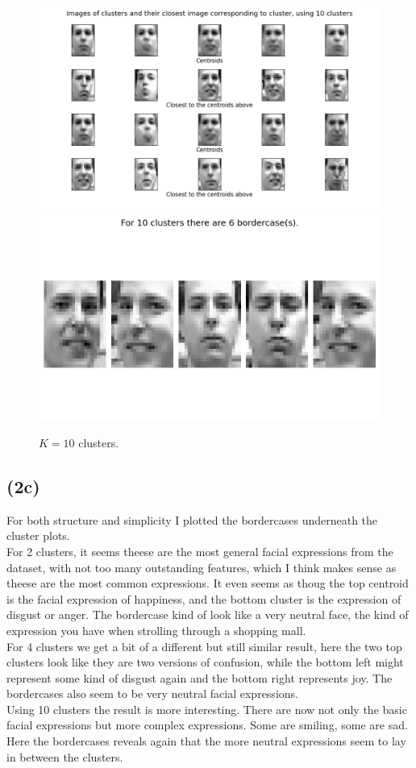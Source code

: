 \documentclass[12pt, letterpaper]{article}
\begin{document}
      \begin{figure}[H]
        \caption{$K = 10$ clusters.}
        \centering
        \includegraphics[scale=0.7]{cluster10}
        \includegraphics[scale=0.4]{border10}
      \end{figure}
    \subsection*{(2c)}
      For both structure and simplicity I plotted the bordercases underneath the cluster plots.\\
      For 2 clusters, it seems theese are the most general facial expressions from the dataset, with not too many outstanding features, which I think makes sense as theese are the most common expressions. It even seems as thoug the top centroid is the facial expression of happiness, and the bottom cluster is the expression of disgust or anger. The bordercase kind of look like a very neutral face, the kind of expression you have when strolling through a shopping mall.\\
      For 4 clusters we get a bit of a different but still similar result, here the two top clusters look like they are two versions of confusion, while the bottom left might represent some kind of disgust again and the bottom right represents joy. The bordercases also seem to be very neutral facial expressions.\\
      Using 10 clusters the result is more interesting. There are now not only the basic facial expressions but more complex expressions. Some are smiling, some are sad. Here the bordercases reveals again that the more neutral expressions seem to lay in between the clusters.
\end{document}
